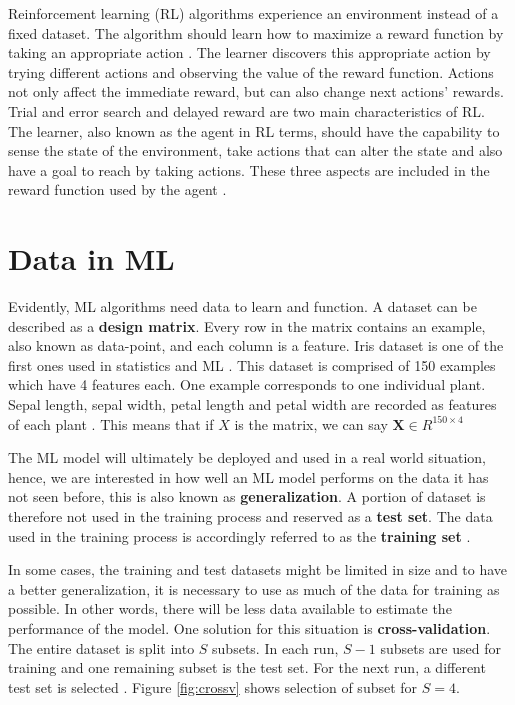 Reinforcement learning (RL) algorithms experience an environment instead of a fixed dataset. The algorithm should learn how to maximize a reward function by taking an appropriate action \cite{sutton1992introduction}. The learner discovers this appropriate action by trying different actions and observing the value of the reward function. Actions not only affect the immediate reward, but can also change next actions' rewards. Trial and error search and delayed reward are two main characteristics of RL.\\The learner, also known as the agent in RL terms, should have the capability to sense the state of the environment, take actions that can alter the state and also have a goal to reach by taking actions. These three aspects are included in the reward function used by the agent \cite{sutton1992introduction}. 

\section{Data in ML}

Evidently, ML algorithms need data to learn and function. A dataset can be described as a \textbf{design matrix}. Every row in the matrix contains an example, also known as data-point, and each column is a feature. Iris dataset is one of the first ones used in statistics and ML \cite{Fischer1936Iris}. This dataset is comprised of 150 examples which have 4 features each. One example corresponds to one individual plant. Sepal length, sepal width, petal length and petal width are recorded as features of each plant \cite{Fischer1936Iris}.
This means that if $X$ is the matrix, we can say $\mathbf{X} \in R^{150 \times 4}$

The ML model will ultimately be deployed and used in a real world situation, hence, we are interested in how well an ML model performs on the data it has not seen before, this is also known as \textbf{generalization}. A portion of dataset is therefore not used in the training process and reserved as a \textbf{test set}. The data used in the training process is accordingly referred to as the \textbf{training set} \cite{IanGoodfellow2016}. 

In some cases, the training and test datasets might be limited in size and to have a better generalization, it is necessary to use as much of the data for training as possible. In other words, there will be less data available to estimate the performance of the model. One solution for this situation is \textbf{cross-validation}. The entire dataset is split into ${S}$ subsets. In each run, ${S - 1}$ subsets are used for training and one remaining subset is the test set. For the next run, a different test set is selected \cite{bishop2006pattern}. Figure \ref{fig:crossv} shows selection of subset for ${S = 4}$.

